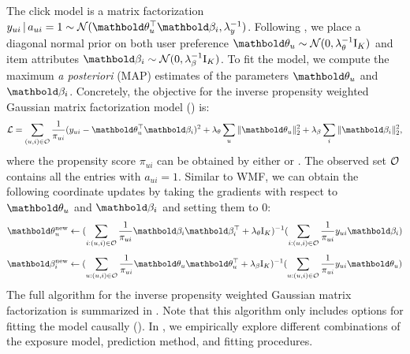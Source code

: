 The click model is a matrix factorization $y_{ui} \g a_{ui} = 1 \sim \cN(\mb\theta_u^\top \mb\beta_i, \lambda_y^{-1})$.
Following , we place a diagonal normal prior on both user preference
$\mb\theta_u \sim \mathcal{N}(0, \lambda_\theta^{-1} \mathrm{I}_K)$ and
item attributes
$\mb\beta_i \sim \mathcal{N}(0, \lambda_\beta^{-1}\mathrm{I}_K)$. To fit the model, we compute the maximum \emph{a posteriori} (MAP)
estimates of the parameters $\mb\theta_u$ and $\mb\beta_i$. Concretely, the objective for the inverse propensity weighted Gaussian matrix factorization model () is:
\begin{equation*}
\cL = \sum_{(u, i)\in \cO} \frac{1}{\pi_{ui}}(y_{ui} - \mb\theta_u^\top\mb\beta_i)^2 + \lambda_\theta \sum_u \|\mb\theta_u \|^2_2 + \lambda_\beta \sum_i \|\mb\beta_i \|_2^2,
\label{chpt:causal_rec:eq:gmf_logll}
\end{equation*}
where the propensity score $\pi_{ui}$ can be obtained by either  or . The observed set $\mathcal{O}$ contains all the entries with $a_{ui} = 1$. Similar to \gls{WMF}, we can obtain the following coordinate updates by taking the gradients with respect to $\mb\theta_u$ and $\mb\beta_i$ and setting them to 0:
\begin{equation}
\mb\theta_u^\new \leftarrow (\sum_{i: (u, i) \in \cO} \frac{1}{\pi_{ui}}\mb\beta_i \mb\beta_i^\top + \lambda_\theta \mathrm{I}_K)^{-1} (\sum_{i: (u, i) \in \cO} \frac{1}{\pi_{ui}} y_{ui} \mb\beta_i)
\label{chpt:causal_rec:eq:als_user}
\end{equation}
\begin{equation}
\mb\beta_i^\new \leftarrow (\sum_{u: (u, i)\in\cO} \frac{1}{\pi_{ui}}\mb\theta_u \mb\theta_u^\top + \lambda_\beta \mathrm{I}_K)^{-1} (\sum_{u: (u, i)\in\cO} \frac{1}{\pi_{ui}}y_{ui} \mb\theta_u)
\label{chpt:causal_rec:eq:als_item}
\end{equation}
The full algorithm for the inverse propensity weighted Gaussian matrix factorization is summarized in . Note that this algorithm only includes options for fitting the model causally (). In , we empirically explore different combinations of the exposure model, prediction method, and fitting procedures.

